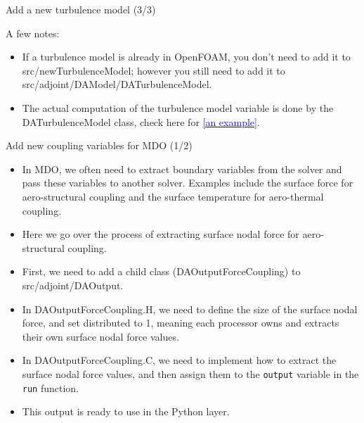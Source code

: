 \documentclass{bredelebeamer}
\begin{document}
\begin{frame}[fragile]{Add a new turbulence model (3/3)}

A few notes:
\begin{itemize}
  \item If a turbulence model is already in OpenFOAM, you don't need to add it to src/newTurbulenceModel; however you still need to add it to src/adjoint/DAModel/DATurbulenceModel.
  \item The actual computation of the turbulence model variable is done by the DATurbulenceModel class, check here for \href{https://github.com/mdolab/dafoam/blob/27d7279e32e62fa2c65399f3441836aefc8401c5/src/adjoint/DASolver/DASimpleFoam/DASimpleFoam.C#L160}{\textcolor{blue}{[an example]}}.
\end{itemize}

\end{frame}


\begin{frame}[fragile]{Add new coupling variables for MDO (1/2)}

\begin{itemize}
  \item In MDO, we often need to extract boundary variables from the solver and pass these variables to another solver. Examples include the surface force for aero-structural coupling and the surface temperature for aero-thermal coupling. 
  \item Here we go over the process of extracting surface nodal force for aero-structural coupling.
  \item First, we need to add a child class (DAOutputForceCoupling) to src/adjoint/DAOutput.
  \item In DAOutputForceCoupling.H, we need to define the size of the surface nodal force, and set distributed to 1, meaning each processor owns and extracts their own surface nodal force values.
  \item In DAOutputForceCoupling.C, we need to implement how to extract the surface nodal force values, and then assign them to the \texttt{output} variable in the \texttt{run} function.
  \item This output is ready to use in the Python layer.
\end{itemize}

\end{frame}
\end{document}
